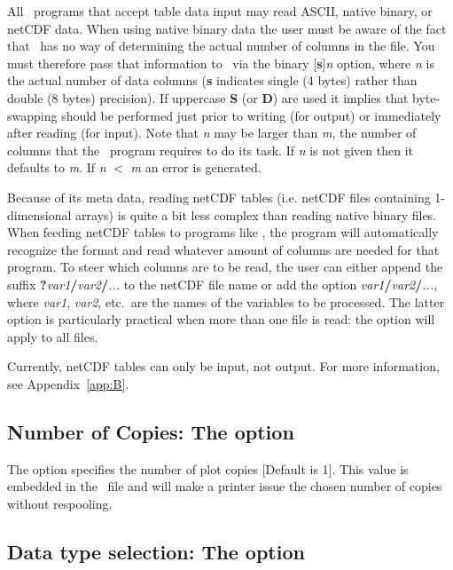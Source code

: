 All \GMT\ programs that accept table data input may read ASCII, native binary, or netCDF data.
When using native binary data the user must be aware
of the fact that \GMT\ has no way of determining the actual
number of columns in the file.  You must therefore pass that
information to \GMT\ via the binary [\textbf{s}]\emph{n} option,
where \emph{n} is the actual number of data columns (\textbf{s}
indicates single (4 bytes) rather than double (8 bytes) precision).  If uppercase
\textbf{S} (or \textbf{D}) are used it implies that byte-swapping should be performed
just prior to writing (for output) or immediately after  reading (for input).
Note that \emph{n} may be larger than \emph{m}, the number of
columns that the \GMT\ program requires to do its task.
If \emph{n} is not given then it defaults to \emph{m}.
If \emph{n} $<$ \emph{m} an error is generated.

Because of its meta data, reading netCDF tables (i.e. netCDF files containing 1-dimensional arrays)
is quite a bit less complex than reading native binary files. When feeding netCDF tables to programs
like , the program will automatically recognize the format and read whatever amount of
columns are needed for that program. To steer which columns are to be read, the user can either
append the suffix \textbf{?}\emph{var1}\textbf{/}\emph{var2}\textbf{/}\emph{...} to the netCDF file name
or add the option \emph{var1}\textbf{/}\emph{var2}\textbf{/}\emph{...}, where \emph{var1}, \emph{var2}, etc.\
are the names of the variables to be processed. The latter option is particularly practical when more
than one file is read: the \Opt{bic} option will apply to all files.

Currently, netCDF tables can only be input, not output.
For more information, see Appendix~\ref{app:B}.

\subsection{Number of Copies: The  option}

The  option specifies the number of plot copies [Default is 1].  This
value is embedded in the \PS\ file and will make a printer issue the chosen
number of copies without respooling.

\subsection{Data type selection: The  option}

